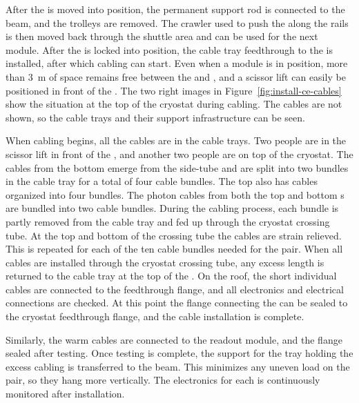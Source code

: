 After the  is moved into position, the permanent support rod is connected to the  beam, and the trolleys are removed. 
The crawler used to push the  along the rails is then moved back through the shuttle area and can be used for the next module. 
After the  is locked into position, the cable tray feedthrough to the  is installed, after which %
 cabling can start. 
Even when a  module is %
in position, more than \SI{3}{m} of space remains free between the  and , and a scissor lift can easily be positioned in front of the . 
The two right images in Figure~\ref{fig:install-ce-cables} show the situation at the top of the cryostat during cabling. The cables are not shown, so the cable trays and their support infrastructure can be seen. 

When cabling begins, all the cables are in the cable trays. 
Two people are in the scissor lift in front of the , and another %
two people are on top of the cryostat. 
The  cables from the bottom  emerge from the  side-tube  and are split into two bundles in the cable tray for a total of four cable bundles. 
The top  also has  cables organized into four bundles. 
The photon cables from both the top and bottom s are bundled into two cable bundles.
During the cabling process, each bundle is partly removed from the cable tray and  fed up through the cryostat crossing tube. 
At the top and bottom of the crossing tube  the cables are strain relieved.
This is repeated for each of the ten cable bundles needed for the  pair. 
When all cables are installed through the cryostat crossing tube, any excess length is returned to the cable tray at the top of the . 
On the roof, the short individual cables are %
connected to the feedthrough flange, and %
all electronics and electrical connections are checked. At this point the flange connecting the  can be sealed to the cryostat feedthrough flange, and the cable installation is complete. 

Similarly, the  warm cables are connected to the readout module, and the flange sealed after testing.  Once testing is complete, the support for the tray holding the excess cabling is transferred to the  beam.  This minimizes any uneven load on the  pair, so they hang more vertically.   
The electronics for each  is continuously monitored after installation. 

